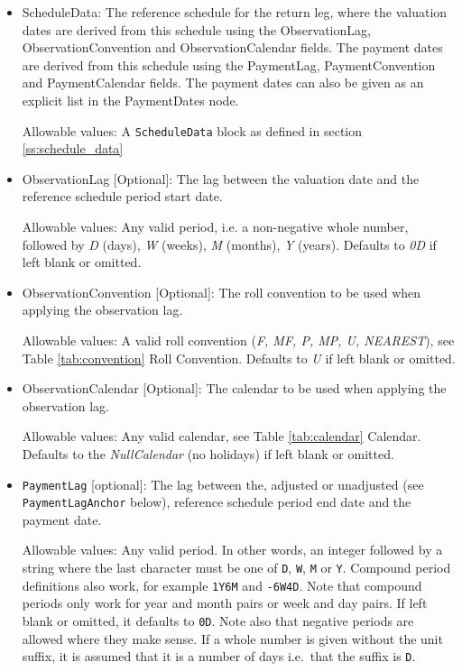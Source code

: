 \begin{itemize}
\begin{itemize}
  \item ScheduleData: The reference schedule for the return leg, where the valuation dates are derived from this schedule
    using the ObservationLag, ObservationConvention and ObservationCalendar fields. The payment dates are derived from
    this schedule using the PaymentLag, PaymentConvention and PaymentCalendar fields. The payment dates can also be
    given as an explicit list in the PaymentDates node.
    
    Allowable values: A \lstinline!ScheduleData! block as defined in section \ref{ss:schedule_data}
    
  \item ObservationLag [Optional]: The lag between the valuation date and the reference schedule period start date.
  
    Allowable values: Any valid period, i.e. a non-negative whole number, followed by \emph{D} (days), \emph{W} (weeks), \emph{M} (months), \emph{Y} (years). Defaults to \emph{0D} if left blank or omitted.
    
  \item ObservationConvention [Optional]: The roll convention to be used when applying the observation lag.
  
    Allowable values: A valid roll convention (\emph{F, MF, P, MP, U, NEAREST}), see Table \ref{tab:convention} Roll Convention. Defaults to \emph{U} if left blank or omitted.
    
  \item ObservationCalendar [Optional]: The calendar to be used when applying the observation lag.
  
      Allowable values: Any valid calendar, see Table \ref{tab:calendar} Calendar. Defaults to the \emph{NullCalendar} (no holidays) if left blank or omitted.
      
  \item \lstinline!PaymentLag! [optional]:
  The lag between the, adjusted or unadjusted (see \lstinline!PaymentLagAnchor! below), reference schedule period end 
  date and the payment date.
  
  Allowable values: Any valid period.
  In other words, an integer followed by a string where the last character must be one of 
  \lstinline!D!, \lstinline!W!, \lstinline!M! or \lstinline!Y!.
  Compound period definitions also work, for example \lstinline!1Y6M! and \lstinline!-6W4D!.
  Note that compound periods only work for year and month pairs or week and day pairs.
  If left blank or omitted, it defaults to \lstinline!0D!.
  Note also that negative periods are allowed where they make sense.
  If a whole number is given without the unit suffix, it is assumed that it is a number of days i.e.\ 
  that the suffix is \lstinline!D!.


\end{itemize}
\end{itemize}
